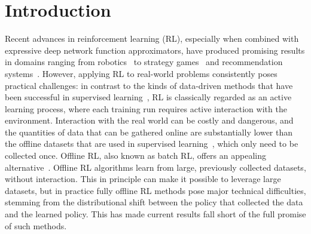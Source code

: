 \vspace{-0.25cm}
\section{Introduction}
\vspace{-0.25cm}
Recent advances in reinforcement learning (RL), especially when combined with expressive deep network function approximators, have produced promising results in domains ranging from robotics~\citep{kalashnikov2018qtopt} to strategy games~\citep{alphastar} and recommendation systems~\citep{li2010contextual}. However, applying RL to real-world problems consistently poses practical challenges: in contrast to the kinds of data-driven methods that have been successful in supervised learning~\citep{resnet,bert}, RL is classically regarded as an active learning process, where each training run requires active interaction with the environment. Interaction with the real world can be costly and dangerous, and the quantities of data that can be gathered online are substantially lower than the offline datasets that are used in supervised learning~\citep{imagenet}, which only need to be collected once. Offline RL, also known as batch RL, offers an appealing alternative~\citep{ernst2005tree,fujimoto2018off,kumar2019stabilizing,agarwal2019optimistic,jaques2019way,siegel2020keep,levine2020offline}. Offline RL algorithms learn from large, previously collected datasets, without interaction. This in principle can make it possible to leverage large datasets, but in practice fully offline RL methods pose major technical difficulties, stemming from the distributional shift between the policy that collected the data and the learned policy. This has made current results fall short of the full promise of such methods.

